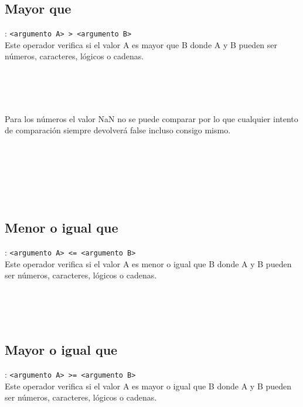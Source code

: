       \subsection*{Mayor que}: \texttt{<argumento A>~\texttt{>} <argumento B>}\\
      Este operador verifica si el valor A es mayor que B donde A y B pueden ser números, caracteres, lógicos o cadenas.
      
      \begin{fxcode}
         \\
         \\
         \\
      \end{fxcode}
      
      Para los números el valor NaN no se puede comparar por lo que cualquier intento de comparación siempre devolverá false incluso consigo mismo.
      
      \begin{fxcode}
         \\
         \\
         \\
         \\
         \\
      \end{fxcode}
      
      \subsection*{Menor o igual que}: \texttt{<argumento A>~<= <argumento B>}\\
      Este operador verifica si el valor A es menor o igual que B donde A y B pueden ser números, caracteres, lógicos o cadenas.
      
      \begin{fxcode}
         \\
         \\
         \\
      \end{fxcode}
      
      \subsection*{Mayor o igual que}: \texttt{<argumento A>~>= <argumento B>}\\
      Este operador verifica si el valor A es mayor o igual que B donde A y B pueden ser números, caracteres, lógicos o cadenas.
      
